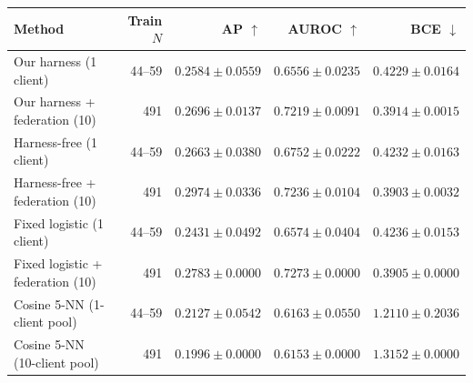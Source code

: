 \centering\footnotesize\setlength{\tabcolsep}{3pt}
\begin{tabularx}{\linewidth}{Xrrrr}
\toprule
Method & Train $N$ & AP $\uparrow$ & AUROC $\uparrow$ & BCE $\downarrow$ \\
\midrule
Our harness (1 client) & 44--59 & \(0.2584\pm0.0559\) & \(0.6556\pm0.0235\) & \(0.4229\pm0.0164\) \\
Our harness + federation (10) & 491 & \(0.2696\pm0.0137\) & \(0.7219\pm0.0091\) & \(0.3914\pm0.0015\) \\
Harness-free (1 client) & 44--59 & \(0.2663\pm0.0380\) & \(0.6752\pm0.0222\) & \(0.4232\pm0.0163\) \\
Harness-free + federation (10) & 491 & \(0.2974\pm0.0336\) & \(0.7236\pm0.0104\) & \(0.3903\pm0.0032\) \\
Fixed logistic (1 client) & 44--59 & \(0.2431\pm0.0492\) & \(0.6574\pm0.0404\) & \(0.4236\pm0.0153\) \\
Fixed logistic + federation (10) & 491 & \(0.2783\pm0.0000\) & \(0.7273\pm0.0000\) & \(0.3905\pm0.0000\) \\
Cosine 5-NN (1-client pool) & 44--59 & \(0.2127\pm0.0542\) & \(0.6163\pm0.0550\) & \(1.2110\pm0.2036\) \\
Cosine 5-NN (10-client pool) & 491 & \(0.1996\pm0.0000\) & \(0.6153\pm0.0000\) & \(1.3152\pm0.0000\) \\
\bottomrule
\end{tabularx}
\caption{Actual local-training study: mean and sample SD over five compound partitions, evaluated on the same 148 final conditions (22 positives). All ten-client arms access the same 491 training rows; direct and loop have identical access within each client count. Zero fixed-ten-client variance reflects an identical pooled objective, not five independent datasets. Untuned cosine references use the same pools and features, added retrospectively after the study as centralized fixed-reference computations.}
\label{tab:federated-research}
